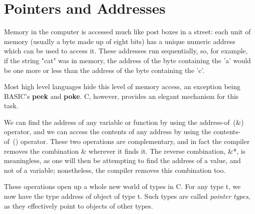
\section{Pointers and Addresses}

     Memory in the computer is accessed much like post boxes in a
street: each unit of  memory (usually a byte made up of eight bits)
has a unique numeric  {\kc address} which  can be  used to  access
it. These addresses run sequentially, so,  for example, if the string
{\cd "cat"} was in memory, the address of the  byte containing  the
{\cd 'a'} would be one more or less than the address of the byte
containing the {\cd 'c'}.

     Most high  level languages hide this level of memory access, an
exception being BASIC's  {\bf peek} and  {\bf poke}. C,  however,
provides an elegant mechanism for this task.

     We can  find the address of any variable or function by using the
{\ms address-of\/}~({\cd \&})  operator, and  we can  access the
contents of any address by using the {\ms contents-of\/}~({\cd *})
operator. These two operations are complementary, and in fact the
compiler  removes the  combination {\cd *\&}  wherever it  finds it.
The reverse combination, {\cd \&*},  is meaningless,  as one  will
then be attempting to find the address of  a value,  and not  of a
variable; nonetheless, the compiler removes this combination too.

     These operations open up a whole new world of types in C. For any
type {\ms t\/}, we now  have the  type {\ms address  of object  of
type  t\/}. Such  types are  called {\em pointer types}, as they
effectively point to objects of other types.

